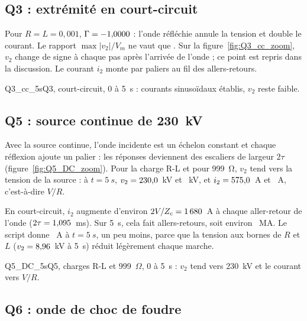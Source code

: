 \subsection{Q3 : extrémité en court-circuit}

Pour $R = L = 0{,}001$, $\Gamma = -1{,}0000$ : l'onde réfléchie annule la tension et double le
courant. Le rapport $\max|v_2|/V_m$ ne vaut que \rapCC. Sur la figure~\ref{fig:Q3_cc_zoom},
$v_2$ change de signe à chaque pas après l'arrivée de l'onde ; ce point est repris dans la
discussion. Le courant $i_2$ monte par paliers au fil des allers-retours.

{Q3_cc_5s}{Q3, court-circuit, 0 à 5~s : courants sinusoïdaux établis, $v_2$ reste faible.}

\subsection{Q5 : source continue de 230~kV}

Avec la source continue, l'onde incidente est un échelon constant et chaque réflexion ajoute un
palier : les réponses deviennent des escaliers de largeur $2\tau$
(figure~\ref{fig:Q5_DC_zoom}). Pour la charge R-L et pour 999~\unit{\ohm}, $v_2$ tend vers la
tension de la source : à $t = \SI{5}{s}$, $v_2 = 230{,}0$~kV et \dcVOuv~kV, et $i_2 = 575{,}0$~A
et \dcIOuv~A, c'est-à-dire $V/R$.

En court-circuit, $i_2$ augmente d'environ $2V/Z_c = 1\,680$~A à chaque aller-retour de
l'onde ($2\tau = 1{,}095$~ms). Sur 5~s, cela fait \nbAR{} allers-retours, soit environ
\estimDC~MA. Le script donne \dcICC~A à $t = \SI{5}{s}$, un peu moins, parce que la tension aux
bornes de $R$ et $L$ ($v_2 = 8{,}96$~kV à 5~s) réduit légèrement chaque marche.

{Q5_DC_5s}{Q5, charges R-L et 999~$\Omega$, 0 à 5~s : $v_2$ tend vers 230~kV et le courant
vers $V/R$.}


\subsection{Q6 : onde de choc de foudre}


